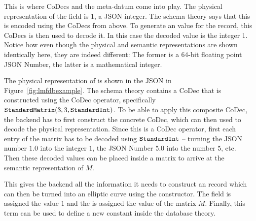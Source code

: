 This is where CoDecs and the  meta-datum come into play. 
The physical representation of the  field is $1$, a JSON integer. 
The schema theory says that this is encoded using the  CoDecs from above. 
To generate an \mmt value for the record, this CoDecs is then used to decode it. 
In this case the decoded value is the integer $1$. 
Notice how even though the physical and semantic representations are shown identically here, they are indeed different: The former is a 64-bit floating point JSON Number, the latter is a mathematical integer. 

The physical representation of  is shown in the JSON in Figure~\ref{fig:lmfdbexample}. 
The schema theory contains a CoDec that is constructed using the  CoDec operator, specifically $\plaintt{StandardMatrix}(3, 3, \plaintt{StandardInt})$. 
To be able to apply this composite CoDec, the backend has to first construct the concrete CoDec, which can then used to decode the physical representation. 
Since this is a CoDec operator, first each entry of the matrix has to be decoded using $\plaintt{StandardInt}$ -- turning the JSON number $1.0$ into the integer $1$, the JSON Number $5.0$ into the number $5$, etc. 
Then these decoded values can be placed inside a matrix to arrive at the semantic representation of $M$. 

This gives the backend all the information it needs to construct an \mmt record which can then be turned into an elliptic curve using the  constructor. 
The  field is assigned the value $1$ and the  is assigned the value of the matrix $M$. 
Finally, this \mmt term can be used to define a new constant inside the database theory.



